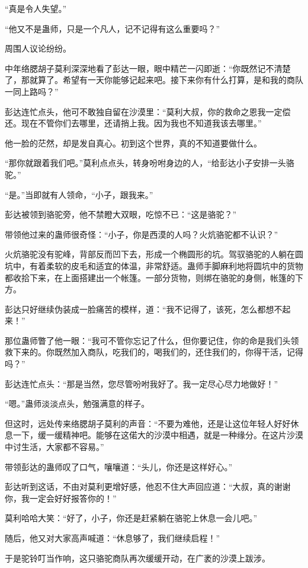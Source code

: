 \begin{this_body}
“真是令人失望。”

“他又不是蛊师，只是一个凡人，记不记得有这么重要吗？”

周围人议论纷纷。

中年络腮胡子莫利深深地看了彭达一眼，眼中精芒一闪即逝：“你既然记不清楚了，那就算了。希望有一天你能够记起来吧。接下来你有什么打算，是和我的商队一同上路吗？”

彭达连忙点头，他可不敢独自留在沙漠里：“莫利大叔，你的救命之恩我一定偿还。现在不管你们去哪里，还请捎上我。因为我也不知道我该去哪里。”

他一脸的茫然，却是发自真心。初到这个世界，真的不知道要做什么。

“那你就跟着我们吧。”莫利点点头，转身吩咐身边的人，“给彭达小子安排一头骆驼。”

“是。”当即就有人领命，“小子，跟我来。”

彭达被领到骆驼旁，他不禁瞪大双眼，吃惊不已：“这是骆驼？”

带领他过来的蛊师很奇怪：“小子，你是西漠的人吗？火炕骆驼都不认识？”

火炕骆驼没有驼峰，背部反而凹下去，形成一个椭圆形的坑。驾驭骆驼的人躺在圆坑中，有着柔软的皮毛和适宜的体温，非常舒适。蛊师手脚麻利地将圆坑中的货物都收拾下来，在上面搭建出一个帐篷。一部分货物，则绑在骆驼的身侧，帐篷的下方。

彭达只好继续伪装成一脸痛苦的模样，道：“我不记得了，该死，怎么都想不起来！”

那位蛊师瞥了他一眼：“我可不管你忘记了什么，但你要记住，你的命是我们头领救下来的。你既然加入商队，吃我们的，喝我们的，还住我们的，你得干活，记得吗？”

彭达连忙点头：“那是当然，您尽管吩咐我好了。我一定尽心尽力地做好！”

“嗯。”蛊师淡淡点头，勉强满意的样子。

但这时，远处传来络腮胡子莫利的声音：“不要为难他，还是让这位年轻人好好休息一下，缓一缓精神吧。能够在这偌大的沙漠中相遇，就是一种缘分。在这片沙漠中讨生活，大家都不容易。”

带领彭达的蛊师叹了口气，嚷嚷道：“头儿，你还是这样好心。”

彭达听到这话，不由对莫利更增好感，他忍不住大声回应道：“大叔，真的谢谢你，我一定会好好报答你的！”

莫利哈哈大笑：“好了，小子，你还是赶紧躺在骆驼上休息一会儿吧。”

随后，他又对大家高声喊道：“休息够了，我们继续启程！”

于是驼铃叮当作响，这只骆驼商队再次缓缓开动，在广袤的沙漠上跋涉。


\end{this_body}
